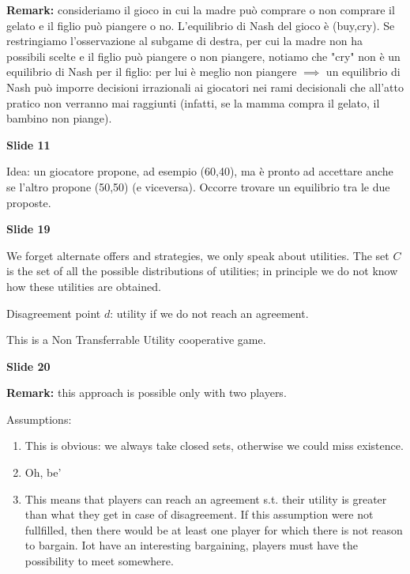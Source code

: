 \documentclass[pt11,a4paper,twoside,reqno,openright]{paper}
\begin{document}
\noindent \textbf{Remark:} consideriamo il gioco in cui la madre può comprare o 
non comprare il gelato e il figlio può piangere o no. L'equilibrio di Nash del 
gioco è (buy,cry). Se restringiamo l'osservazione al subgame di destra, per 
cui la madre non ha possibili scelte e il figlio può piangere o non piangere, 
notiamo che "cry" non è un equilibrio di Nash per il figlio: per lui è meglio 
non piangere $\implies$ un equilibrio di Nash può imporre decisioni irrazionali 
ai giocatori nei rami decisionali che all'atto pratico non verranno mai 
raggiunti (infatti, se la mamma compra il gelato, il bambino non piange).

\bigskip
\noindent \textbf{Slide 11}

\noindent Idea: un giocatore propone, ad esempio (60,40), ma è pronto ad 
accettare anche se l'altro propone (50,50) (e viceversa). Occorre trovare 
un equilibrio tra le due proposte. 

\bigskip
\noindent \textbf{Slide 19}

\noindent We forget alternate offers and strategies, we only speak about 
utilities. The set $C$ is the set of all the possible distributions of utilities; 
in principle we do not know how these utilities are obtained.

\noindent Disagreement point $d$: utility if we do not reach an agreement.

\noindent This is a Non Transferrable Utility cooperative game.

\bigskip
\noindent \textbf{Slide 20}

\noindent \textbf{Remark:} this approach is possible only with two players.

\noindent Assumptions:
\begin{enumerate}
	\item This is obvious: we always take closed sets, otherwise we could 
	miss existence.
	\item Oh, be'
	\item This means that players can reach an agreement s.t. their utility 
	is greater than what they get in case of disagreement. If this assumption 
	were not fullfilled, then there would be at least one player for which 
	there is not reason to bargain. Iot have an interesting bargaining, 
	players must have the possibility to meet somewhere.
\end{enumerate}
\end{document}
